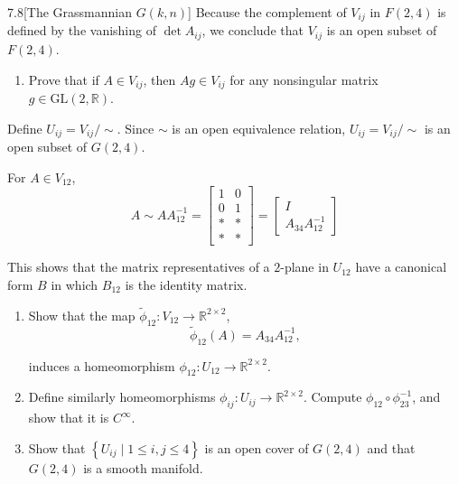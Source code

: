 \begin{problem}{7.8}[The Grassmannian \(G(k, n)\)]
Because the complement of \(V_{ij}\) in \(F(2,4)\) is defined by the vanishing of \( \det A_{ij} \), we conclude that \( V_{ij} \) is an open subset of \( F(2, 4) \).

\begin{enumerate}[label={(\alph*)}, resume]
    \item Prove that if \( A \in V_{ij} \), then \( Ag \in V_{ij} \) for any nonsingular matrix \( g \in \mathrm{GL}(2, \mathbb{R}) \).
\end{enumerate}

Define \( U_{ij} = V_{ij}/\!\sim \). Since \( \sim \) is an open equivalence relation, \( U_{ij} = V_{ij}/\!\sim \) is an open subset of \( G(2, 4) \).

For \( A \in V_{12} \),
\[
    A \sim AA_{12}^{-1} = \begin{bmatrix}
        1 & 0 \\
        0 & 1 \\
        * & * \\
        * & *
    \end{bmatrix} = \begin{bmatrix}
        I \\
        A_{34}A_{12}^{-1}
    \end{bmatrix}
\]

This shows that the matrix representatives of a \(2\)-plane in \( U_{12} \) have a canonical form \(B\) in which \( B_{12} \) is the identity matrix.
\begin{enumerate}[label={(\alph*)}, resume]
    \item Show that the map \( \tilde{\phi}_{12}: V_{12} \to \mathbb{R}^{2\times 2} \),
          \[
              \tilde{\phi}_{12}(A) = A_{34}A_{12}^{-1},
          \]

          induces a homeomorphism \( \phi_{12}: U_{12} \to \mathbb{R}^{2\times 2} \).
    \item Define similarly homeomorphisms \( \phi_{ij}: U_{ij} \to \mathbb{R}^{2\times 2} \). Compute \( \phi_{12} \circ \phi_{23}^{-1} \), and show that it is \( C^{\infty} \).
    \item Show that \( \left\{ U_{ij} \mid 1 \leq i, j\leq 4 \right\} \) is an open cover of \( G(2, 4) \) and that \( G(2, 4) \) is a smooth manifold.
\end{enumerate}
\end{problem}

